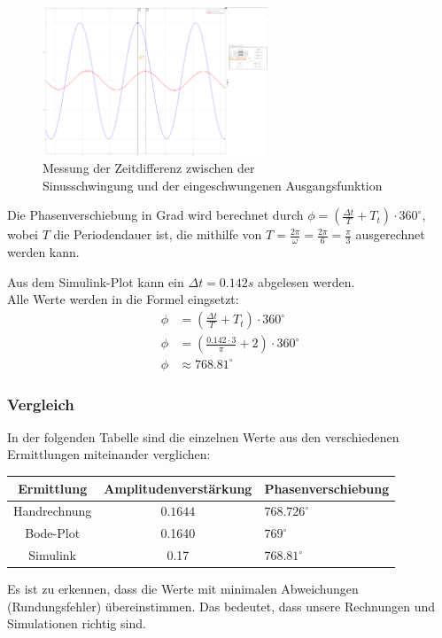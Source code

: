  \begin{figure}[H]
    \centering
    \includegraphics[width=0.6\textwidth]{Bilder/SimulinkPhase.png}
    \caption[width=0.6\textwidth]{Messung der Zeitdifferenz zwischen der \\ Sinusschwingung und der eingeschwungenen Ausgangsfunktion}
 \end{figure}

Die Phasenverschiebung in Grad wird berechnet durch $\phi = (\frac{\Delta t}{T} +T_t ) \cdot 360^{\circ}$, wobei $T$ die Periodendauer ist, die mithilfe von $T = \frac{2\pi}{\omega} = \frac{2\pi}{6} = \frac{\pi}{3}$ ausgerechnet werden kann.

Aus dem Simulink-Plot kann ein $\Delta t = 0.142s$ abgelesen werden.\\
Alle Werte werden in die Formel eingsetzt:
\begin{align*}
    \phi &= (\frac{\Delta t}{T} +T_t ) \cdot 360^{\circ} \\
    \phi &= (\frac{0.142 \cdot 3}{\pi} +2 ) \cdot 360^{\circ} \\
    \phi & \approx 768.81^{\circ}
\end{align*}
\subsubsection{Vergleich}
In der folgenden Tabelle sind die einzelnen Werte aus den verschiedenen Ermittlungen miteinander verglichen:
\renewcommand{\arraystretch}{1.2}
\begin{center}
    \begin{tabular}{ c|c|l } 
    Ermittlung & Amplitudenverstärkung & Phasenverschiebung \\
    \hline
    Handrechnung & $0.1644$ & $768.726^{\circ}$ \\ 
    Bode-Plot & 0.1640 & $769^{\circ}$ \\ 
    Simulink & 0.17 & $768.81^{\circ}$ \\ 
    \end{tabular}
\end{center}
Es ist zu erkennen, dass die Werte mit minimalen Abweichungen (Rundungsfehler) übereinstimmen. Das bedeutet, dass unsere Rechnungen und Simulationen richtig sind. 



